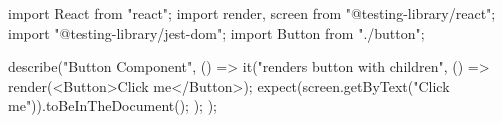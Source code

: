 import React from "react";
import { render, screen } from "@testing-library/react";
import "@testing-library/jest-dom";
import Button from "./button";

describe("Button Component", () => {
  it("renders button with children", () => {
    render(<Button>Click me</Button>);
    expect(screen.getByText("Click me")).toBeInTheDocument();
  });
});
